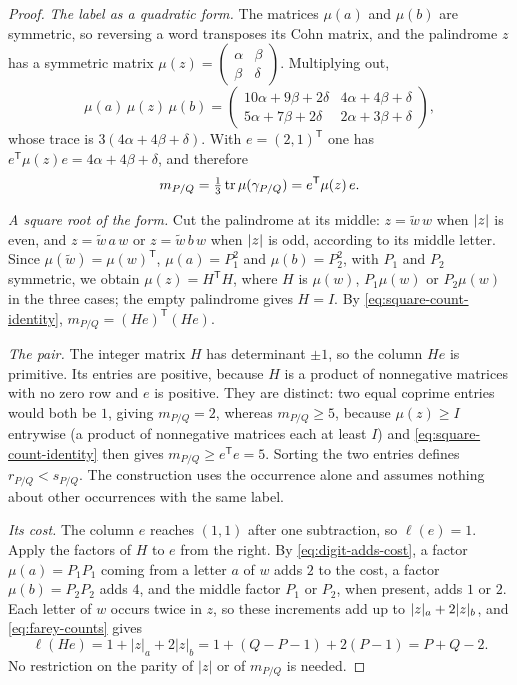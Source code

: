 \begin{proof}
\emph{The label as a quadratic form.} The matrices $\mu(a)$ and $\mu(b)$
are symmetric, so reversing a word transposes its Cohn matrix, and the
palindrome $z$ has a symmetric matrix
$\mu(z)=\left(\begin{smallmatrix}\alpha&\beta\\\beta&\delta\end{smallmatrix}\right)$.
Multiplying out,
$$
 \mu(a)\,\mu(z)\,\mu(b)=
 \begin{pmatrix}
 10\alpha+9\beta+2\delta & 4\alpha+4\beta+\delta\\
 5\alpha+7\beta+2\delta & 2\alpha+3\beta+\delta
 \end{pmatrix},
$$
whose trace is $3(4\alpha+4\beta+\delta)$. With $e=(2,1)^{\mathsf T}$ one has
$e^{\mathsf T}\mu(z)e=4\alpha+4\beta+\delta$, and therefore
\begin{equation}\label{eq:square-count-identity}
 m_{P/Q}=\tfrac13\operatorname{tr}\mu(\gamma_{P/Q})=e^{\mathsf T}\mu(z)\,e .
\end{equation}

\emph{A square root of the form.} Cut the palindrome at its middle:
$z=\widetilde w\,w$ when $\lvert z\rvert$ is even, and $z=\widetilde w\,a\,w$ or
$z=\widetilde w\,b\,w$ when $\lvert z\rvert$ is odd, according to its middle letter.
Since $\mu(\widetilde w)=\mu(w)^{\mathsf T}$, $\mu(a)=P_1^2$ and
$\mu(b)=P_2^2$, with $P_1$ and $P_2$ symmetric, we obtain
$\mu(z)=H^{\mathsf T}H$, where $H$ is $\mu(w)$, $P_1\mu(w)$ or $P_2\mu(w)$ in
the three cases; the empty palindrome gives $H=I$. By
\eqref{eq:square-count-identity}, $m_{P/Q}=(He)^{\mathsf T}(He)$.

\emph{The pair.} The integer matrix $H$ has determinant $\pm1$, so the
column $He$ is primitive. Its entries are positive, because $H$ is a product
of nonnegative matrices with no zero row and $e$ is positive. They are
distinct: two equal coprime entries would both be $1$, giving
$m_{P/Q}=2$, whereas $m_{P/Q}\geqslant5$, because $\mu(z)\geqslant I$ entrywise
(a product of nonnegative matrices each at least $I$) and
\eqref{eq:square-count-identity} then gives $m_{P/Q}\geqslant e^{\mathsf T}e=5$. Sorting the two entries defines
$r_{P/Q}<s_{P/Q}$. The construction uses the occurrence alone and assumes
nothing about other occurrences with the same label.

\emph{Its cost.} The column $e$ reaches $(1,1)$ after one subtraction, so
$\ell(e)=1$. Apply the factors of $H$ to $e$ from the right. By
\eqref{eq:digit-adds-cost}, a factor $\mu(a)=P_1P_1$ coming from a letter
$a$ of $w$ adds $2$ to the cost, a factor $\mu(b)=P_2P_2$ adds $4$, and the
middle factor $P_1$ or $P_2$, when present, adds $1$ or $2$. Each letter of
$w$ occurs twice in $z$, so these increments add up to $\lvert z\rvert_a+2\lvert z\rvert_b$,
and \eqref{eq:farey-counts} gives
$$
 \ell(He)=1+|z|_a+2|z|_b
 =1+(Q-P-1)+2(P-1)=P+Q-2.
$$
No restriction on the parity of $|z|$ or of $m_{P/Q}$ is needed.
\end{proof}

